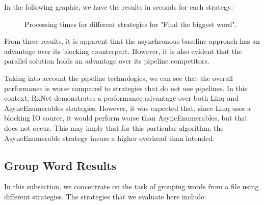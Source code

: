 In the following graphic, we have the results in seconds for each strategy:

\begin{figure}[H]
    \centering
    \caption{Processing times for different strategies for "Find the biggest word".}
    \label{fig:biggest_word_results_cs_2}
\end{figure}


From these results, it is apparent that the asynchronous baseline approach has an advantage over its blocking counterpart. However, it is also evident that the parallel solution holds an advantage over its pipeline competitors.

Taking into account the pipeline technologies, we can see that the overall performance is worse compared to strategies that do not use pipelines. In this context, RxNet demonstrates a performance advantage over both Linq and AsyncEnumerables strategies. However, it was expected that, since Linq uses a blocking IO source, it would perform worse than AsyncEnumerables, but that does not occur. This may imply that for this particular algorithm, the AsyncEnumerable strategy incurs a higher overhead than intended.

\clearpage


\subsection{Group Word Results}
\label{subsubsec:group_word_processing_times_cs}

In this subsection, we concentrate on the task of grouping words from a file using different strategies. The strategies that we evaluate here include:

